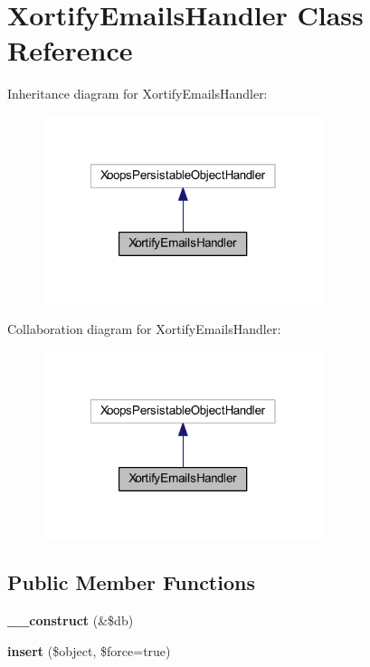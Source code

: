 \hypertarget{class_xortify_emails_handler}{\section{Xortify\-Emails\-Handler Class Reference}
\label{class_xortify_emails_handler}
}


Inheritance diagram for Xortify\-Emails\-Handler\-:
\nopagebreak
\begin{figure}[H]
\begin{center}
\leavevmode
\includegraphics[width=232pt]{class_xortify_emails_handler__inherit__graph}
\end{center}
\end{figure}


Collaboration diagram for Xortify\-Emails\-Handler\-:
\nopagebreak
\begin{figure}[H]
\begin{center}
\leavevmode
\includegraphics[width=232pt]{class_xortify_emails_handler__coll__graph}
\end{center}
\end{figure}
\subsection*{Public Member Functions}
\begin{DoxyCompactItemize}
\item 
\hypertarget{class_xortify_emails_handler_aaf2ef772755ec6f361d44e16cc9ffd69}{{\bfseries \-\_\-\-\_\-construct} (\&\$db)}\label{class_xortify_emails_handler_aaf2ef772755ec6f361d44e16cc9ffd69}

\item 
\hypertarget{class_xortify_emails_handler_a43ce63406579e889066e8a073ff2ccf9}{{\bfseries insert} (\$object, \$force=true)}\label{class_xortify_emails_handler_a43ce63406579e889066e8a073ff2ccf9}

\end{DoxyCompactItemize}


